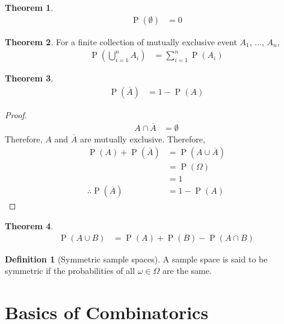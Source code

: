\documentclass[titlepage, fleqn, a4paper, 12pt, twoside]{article}
\theoremstyle{definition}
\newtheorem{definition}{Definition}
\theoremstyle{theorem}
\newtheorem{theorem}{Theorem}
\DeclareMathOperator{\prob}{\mathrm{P}}
\begin{document}
\begin{theorem}
	\begin{align*}
		\prob(\emptyset) & = 0
	\end{align*}
\end{theorem}

\begin{theorem}
	For a finite collection of mutually exclusive event $A_1$, $\dots$, $A_n$,
	\begin{align*}
		\prob\left( \bigcup\limits_{i = 1}^{n} A_i \right) & = \sum\limits_{i = 1}^{n} \prob(A_i)
	\end{align*}
\end{theorem}

\begin{theorem}
	\begin{align*}
		\prob\left( \overline{A} \right) & = 1 - \prob(A)
	\end{align*}
\end{theorem}

\begin{proof}
	\begin{align*}
		A \cap \overline{A} & = \emptyset
	\end{align*}
	Therefore, $A$ and $\overline{A}$ are mutually exclusive.
	Therefore,
	\begin{align*}
		\prob(A) + \prob\left( \overline{A} \right) & = \prob\left( A \cup \overline{A} \right) \\
                                                            & = \prob(\Omega)                           \\
                                                            & = 1                                       \\
		\therefore \prob\left( \overline{A} \right) & = 1 - \prob(A)
	\end{align*}
\end{proof}

\begin{theorem}
	\begin{align*}
		\prob(A \cup B) & = \prob(A) + \prob(B) - \prob(A \cap B)
	\end{align*}
\end{theorem}

\begin{definition}[Symmetric sample spaces]
	A sample space is said to be symmetric if the probabilities of all $\omega \in \Omega$ are the same.
\end{definition}

\section{Basics of Combinatorics}
\end{document}
